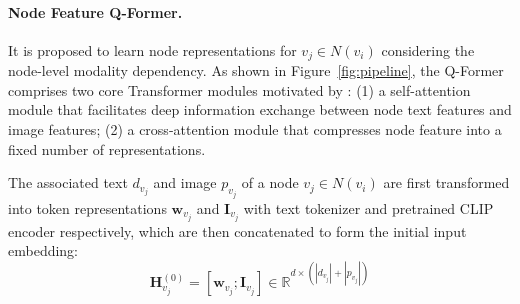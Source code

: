 \paragraph{Node Feature Q-Former.} It is proposed to learn node representations for $v_j\in N(v_i)$ considering the node-level modality dependency.
As shown in Figure~\ref{fig:pipeline}, the Q-Former comprises two core Transformer \cite{vaswani2017attention} modules motivated by \cite{li2023blip}: (1) a self-attention module that facilitates deep information exchange between node text features and image features; (2) a cross-attention module that compresses node feature into a fixed number of representations.


The associated text $d_{v_j}$ and image $p_{v_j}$ of a node $v_j\in N(v_i)$ are first transformed into token representations $\bm{w}_{v_j}$ and $\bm{I}_{v_j}$ with text tokenizer and pretrained CLIP encoder respectively, which are then concatenated to form the initial input embedding:
\begin{equation}
\mathbf{H}^{(0)}_{v_j} = \left[ \bm{w}_{v_j} ;
\bm{I}_{v_j} \right] \in \mathbb{R}^{d \times (|d_{v_j}| + |p_{v_j}|)}
\end{equation}




